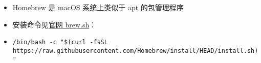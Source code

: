 
\begin{issues}
\issueDraft
\end{issues}

\begin{itemize}
\item Homebrew 是 macOS 系统上类似于 apt 的包管理程序
\item 安装命令见\href{https://brew.sh}{官网 brew.sh}：
\item \verb|/bin/bash -c "$(curl -fsSL https://raw.githubusercontent.com/Homebrew/install/HEAD/install.sh)"|
\end{itemize}
